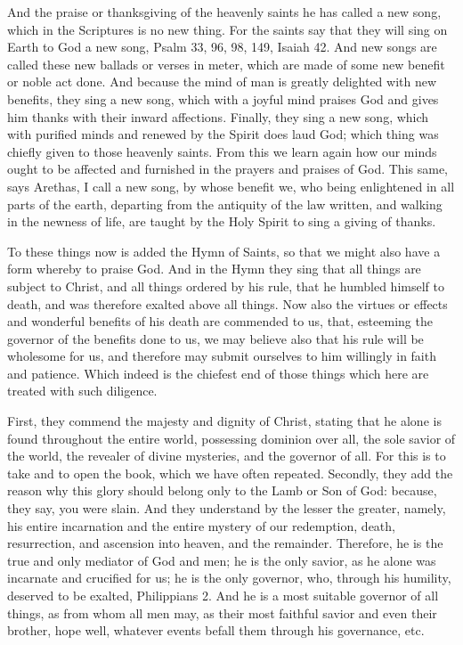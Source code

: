 And the praise or thanksgiving of the heavenly saints he has called a new song, which in the Scriptures is no new thing. For the saints say that they will sing on Earth to God a new song, Psalm 33, 96, 98, 149, Isaiah 42. And new songs are called these new ballads or verses in meter, which are made of some new benefit or noble act done. And because the mind of man is greatly delighted with new benefits, they sing a new song, which with a joyful mind praises God and gives him thanks with their inward affections. Finally, they sing a new song, which with purified minds and renewed by the Spirit does laud God; which thing was chiefly given to those heavenly saints. From this we learn again how our minds ought to be affected and furnished in the prayers and praises of God. This same, says Arethas, I call a new song, by whose benefit we, who being enlightened in all parts of the earth, departing from the antiquity of the law written, and walking in the newness of life, are taught by the Holy Spirit to sing a giving of thanks.

To these things now is added the Hymn of Saints, so that we might also have a form whereby to praise God. And in the Hymn they sing that all things are subject to Christ, and all things ordered by his rule, that he humbled himself to death, and was therefore exalted above all things. Now also the virtues or effects and wonderful benefits of his death are commended to us, that, esteeming the governor of the benefits done to us, we may believe also that his rule will be wholesome for us, and therefore may submit ourselves to him willingly in faith and patience. Which indeed is the chiefest end of those things which here are treated with such diligence.

First, they commend the majesty and dignity of Christ, stating that he alone is found throughout the entire world, possessing dominion over all, the sole savior of the world, the revealer of divine mysteries, and the governor of all. For this is to take and to open the book, which we have often repeated. Secondly, they add the reason why this glory should belong only to the Lamb or Son of God: because, they say, you were slain. And they understand by the lesser the greater, namely, his entire incarnation and the entire mystery of our redemption, death, resurrection, and ascension into heaven, and the remainder. Therefore, he is the true and only mediator of God and men; he is the only savior, as he alone was incarnate and crucified for us; he is the only governor, who, through his humility, deserved to be exalted, Philippians 2. And he is a most suitable governor of all things, as from whom all men may, as their most faithful savior and even their brother, hope well, whatever events befall them through his governance, etc.

